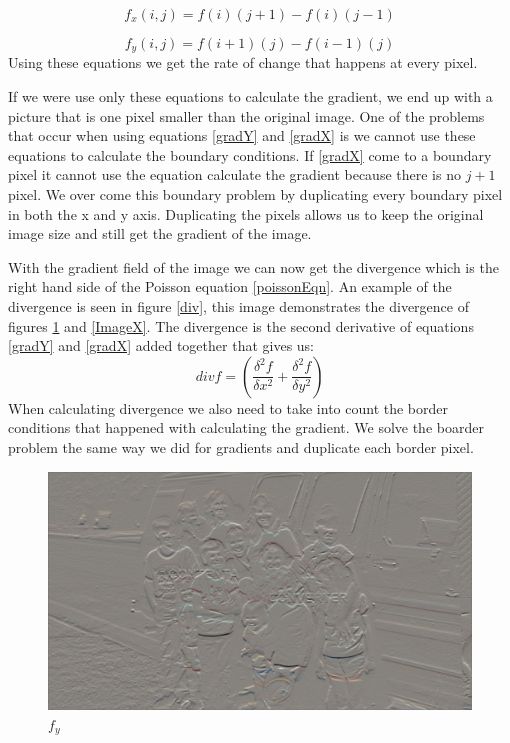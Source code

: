 \documentclass[10pt,twopage]{acmsiggraph}
\begin{document}
\begin{equation}
\ensuremath{f_{x}(i,j) = f(i)(j+1) - f(i)(j-1)}
\label{gradX}
\end{equation}

\begin{equation}
\ensuremath{f_{y}(i,j) = f(i+1)(j) - f(i-1)(j)}
\label{gradY}
\end{equation}
Using these equations we get the rate of change that happens at every pixel. 

If we were use only these equations to calculate the gradient, we end up with a picture that is one pixel smaller than the original image. One of the problems that occur when using equations \ref{gradY} and \ref{gradX} is we cannot use these equations to calculate the boundary conditions. If \ref{gradX} come to a  boundary pixel it cannot use the equation calculate the gradient because there is no $j+1$ pixel. We over come this boundary problem by duplicating every boundary pixel in both the x and y axis. Duplicating the pixels allows us to keep the original image size and still get the gradient of the image.

With the gradient field of the image we can now get the divergence which is the right hand side of the Poisson equation \ref{poissonEqn}. An example of the divergence is seen in figure \ref{div}, this image demonstrates the divergence of figures \ref{ImageY} and \ref{ImageX}. The divergence is the second derivative of equations \ref{gradY} and \ref{gradX} added together that gives us:
\begin{equation}
\label{divergence}
\ensuremath{div f = ( \frac{\delta^2 f}{\delta x^2} + \frac{\delta^2 f}{\delta y^2} )}
\end{equation}
When calculating divergence we also need to take into count the border conditions that happened with calculating the gradient. We solve the boarder problem the same way we did for gradients and duplicate each border pixel.

\begin{figure}
\centering
\includegraphics[width=.44\textwidth]{fig/gradientY.jpg}
\caption{\ensuremath{f_{y}}}   
\label{ImageY}
\end{figure}
\end{document}

